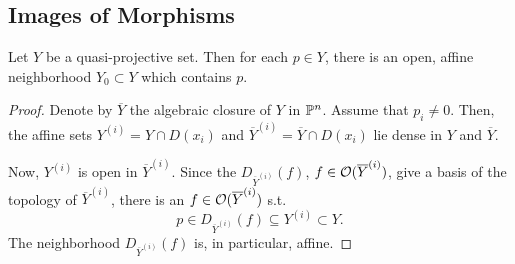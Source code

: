 \subsection{Images of Morphisms}
\begin{lemma}
	Let $Y$ be a quasi-projective set. Then for each $p \in Y$, there is an open, affine neighborhood $Y_0 \subset Y$ which contains $p$.
\end{lemma}
\begin{proof}
	Denote by $\overline{Y}$ the algebraic closure of $Y$ in $\P^n$. Assume that $p_i \neq 0$.
	Then, the affine sets $Y^{(i)} = Y \cap D(x_i)$ and $\overline{Y}^{(i)} = \overline{Y} \cap D(x_i)$ lie dense in $Y$ and $\overline{Y}$.
	
	Now, $Y^{(i)}$ is open in $\overline{Y}^{(i)}$. Since the $D_{\overline{Y}^{(i)}}(f)$, $f \in \O(\overline{Y}^{(i)})$, give a basis of the topology of $\overline{Y}^{(i)}$, there is an $f \in \O(\overline{Y}^{(i)})$ s.t.
	\[ p \in D_{\overline{Y}^{(i)}}(f) \subseteq {Y}^{(i)} \subset Y. \]
	The neighborhood $ D_{\overline{Y}^{(i)}}(f)$ is, in particular, affine.
\end{proof}


